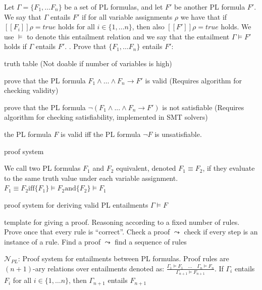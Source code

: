\documentclass[landscape, a4paper]{article}
\begin{document}
\begin{minipage}[t]{0.2\linewidth}
\begin{betterlist}
\begin{betterlist}
		\end{betterlist}
		\item Let $\Gamma = \{F_1, \ldots F_n\}$ be a set of PL formulas, and let $F'$ be another PL formula $F'$. We say that $\Gamma$ \alert{entails} $F'$ if for all variable assignments $\rho$ we have that if $[[F_i]]\rho = true$ holds for all $i \in \{1, \ldots n\}$, then also $[[F']]\rho = true$ holds. We use $\models$ to denote this entailment relation and we say that the entailment $\Gamma \models F'$ holds if $\Gamma$ entails $F'$. . Prove that $\{F_1, \ldots F_n\}$ entails $F'$:
		\begin{betterlist}
			\item truth table (Not doable if number of variables is high)
			\item prove that the PL formula $F_1 \land \ldots \land F_n \rightarrow F'$ is valid (Requires algorithm for checking validity)
			\item prove that the PL formula $\neg(F_1 \land . . . \land F_n \rightarrow F')$ is not satisfiable (Requires algorithm for checking satisfiability, implemented in SMT solvers)
			\begin{betterlist}
				\item the PL formula $F$ is valid iff the PL formula $\neg F$ is unsatisfiable. 
			\end{betterlist}
			\item proof system
		\end{betterlist}
		\item We call two PL formulas $F_1$ and $F_2$ \alert{equivalent}, denoted $F_1 \equiv F_2$, if they evaluate to the same truth value under each variable assignment. $F_1 \equiv F_2 \text{iff} \{F_1\} \models F_2 \text{and} \{F_2\} \models F_1$
	\end{betterlist}
	\fbox{PL Proof system ($N_{PL}$)}
	\begin{betterlist}
		\item proof system for deriving valid PL entailments $\Gamma \models F$
		\item template for giving a proof. Reasoning according to a fixed number of rules. Prove once that every rule is \enquote{correct}. Check a proof $\leadsto$ check if every step is an instance of a rule. Find a proof $\leadsto$ find a sequence of rules
		\item $\mathcal{N}_{PL}$: Proof system for entailments between PL formulas. Proof rules are $(n + 1)$-ary relations over entailments denoted as: $\frac{\Gamma_1 \vDash F_1 \quad \ldots \quad \Gamma_n \vDash F_n}{\Gamma_{n+1} \vDash F_{n+1}}$.  If $\Gamma_i$ entails $F_i$ for all $i \in \{1, \ldots n\}$, then $\Gamma_{n+1}$ entails $F_{n+1}$

\end{betterlist}
\end{minipage}
\end{document}
